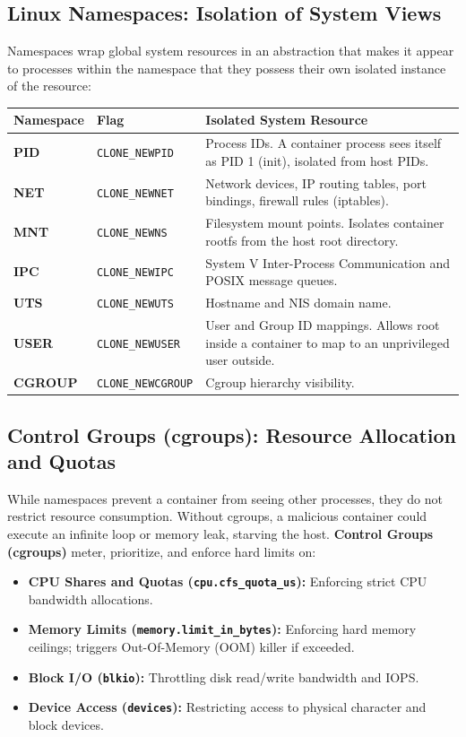 \subsection{Linux Namespaces: Isolation of System Views}
Namespaces wrap global system resources in an abstraction that makes it appear to processes within the namespace that they possess their own isolated instance of the resource:
\begin{center}
\begin{tabularx}{\textwidth}{>{\bfseries}l l X}
\toprule
Namespace & Flag & Isolated System Resource\\
\midrule
PID & \texttt{CLONE\_NEWPID} & Process IDs. A container process sees itself as PID 1 (init), isolated from host PIDs.\\
NET & \texttt{CLONE\_NEWNET} & Network devices, IP routing tables, port bindings, firewall rules (iptables).\\
MNT & \texttt{CLONE\_NEWNS} & Filesystem mount points. Isolates container rootfs from the host root directory.\\
IPC & \texttt{CLONE\_NEWIPC} & System V Inter-Process Communication and POSIX message queues.\\
UTS & \texttt{CLONE\_NEWUTS} & Hostname and NIS domain name.\\
USER & \texttt{CLONE\_NEWUSER} & User and Group ID mappings. Allows root inside a container to map to an unprivileged user outside.\\
CGROUP & \texttt{CLONE\_NEWCGROUP} & Cgroup hierarchy visibility.\\
\bottomrule
\end{tabularx}
\end{center}

\subsection{Control Groups (cgroups): Resource Allocation and Quotas}
While namespaces prevent a container from seeing other processes, they do not restrict resource consumption. Without cgroups, a malicious container could execute an infinite loop or memory leak, starving the host. \textbf{Control Groups (cgroups)} meter, prioritize, and enforce hard limits on:
\begin{itemize}[leftmargin=*]
  \item \textbf{CPU Shares and Quotas (\texttt{cpu.cfs\_quota\_us}):} Enforcing strict CPU bandwidth allocations.
  \item \textbf{Memory Limits (\texttt{memory.limit\_in\_bytes}):} Enforcing hard memory ceilings; triggers Out-Of-Memory (OOM) killer if exceeded.
  \item \textbf{Block I/O (\texttt{blkio}):} Throttling disk read/write bandwidth and IOPS.
  \item \textbf{Device Access (\texttt{devices}):} Restricting access to physical character and block devices.
\end{itemize}

